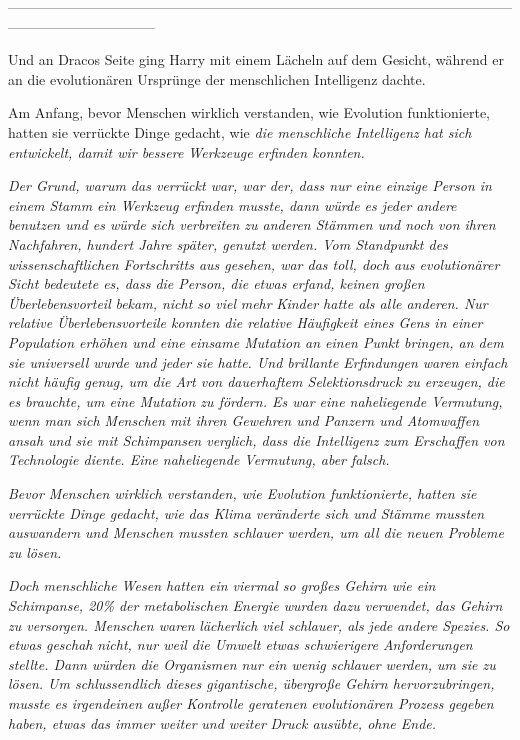{--------------------------------------------------------------------------------------------------------------------------------------------

\hfill\break Und an Dracos Seite ging Harry mit einem Lächeln auf dem Gesicht, während er an die evolutionären Ursprünge der menschlichen Intelligenz dachte.

Am Anfang, bevor Menschen wirklich verstanden, wie Evolution funktionierte, hatten sie verrückte Dinge gedacht, wie \emph{die menschliche Intelligenz hat sich entwickelt, damit wir bessere Werkzeuge erfinden konnten.}

\emph{Der Grund, warum das verrückt war, war der, dass nur eine einzige Person in einem Stamm ein Werkzeug erfinden musste, dann würde es jeder andere benutzen und es würde sich verbreiten zu anderen Stämmen und noch von ihren Nachfahren, hundert Jahre später, genutzt werden. Vom Standpunkt des wissenschaftlichen Fortschritts aus gesehen, war das toll, doch aus evolutionärer Sicht bedeutete es, dass die Person, die etwas erfand, keinen großen Überlebens\emph{vorteil}} \emph{bekam, nicht so viel} \emph{\emph{mehr}} \emph{Kinder hatte als alle anderen. Nur} \emph{\emph{relative}} \emph{Überlebensvorteile konnten die relative Häufigkeit eines Gens in einer Population erhöhen und eine einsame Mutation an einen Punkt bringen, an dem sie universell wurde und jeder sie hatte. Und brillante Erfindungen waren einfach nicht häufig genug, um die Art von dauerhaftem Selektionsdruck zu erzeugen, die es brauchte, um eine Mutation zu fördern. Es war eine naheliegende Vermutung, wenn man sich Menschen mit ihren Gewehren und Panzern und Atomwaffen ansah und sie mit Schimpansen verglich, dass die Intelligenz zum Erschaffen von Technologie diente. Eine naheliegende Vermutung, aber falsch.}

\emph{Bevor Menschen wirklich verstanden, wie Evolution funktionierte, hatten sie verrückte Dinge gedacht, wie} \emph{\emph{das Klima veränderte sich und Stämme mussten auswandern und Menschen mussten schlauer werden, um all die neuen Probleme zu lösen.}}

\emph{Doch menschliche Wesen hatten ein viermal so großes Gehirn wie ein Schimpanse, 20\% der metabolischen Energie wurden dazu verwendet, das Gehirn zu versorgen. Menschen waren} \emph{\emph{lächerlich}} \emph{viel schlauer, als jede} \emph{andere Spezies. So etwas} \emph{geschah} \emph{nicht, nur weil die Umwelt etwas schwierigere Anforderungen stellte. Dann würden die Organismen nur ein wenig schlauer} \emph{werden, um sie zu lösen. Um schlussendlich dieses gigantische, übergroße Gehirn hervorzubringen, musste es irgendeinen} \emph{\emph{außer Kontrolle geratenen}} \emph{evolutionären Prozess gegeben haben, etwas das immer weiter} \emph{und weiter} \emph{Druck ausübte, ohne Ende.}

}

